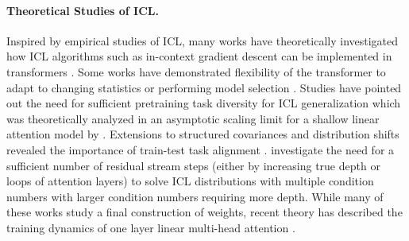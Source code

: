 \documentclass{article} %
\begin{document}
\paragraph{Theoretical Studies of ICL.} Inspired by empirical studies of ICL, many works have theoretically investigated how ICL algorithms such as in-context gradient descent can be implemented in transformers \citep{zhang2023trainedtransformerslearnlinear, ahn2023transformerslearnimplementpreconditioned, von2023transformers, li2023transformersalgorithmsgeneralizationstability, kim2024transformersminimaxoptimalnonparametric, akyurek2022learning, pathak2023transformersoptimallylearnregression, mahankali2023stepgradientdescentprovably}. Some works have demonstrated flexibility of the transformer to adapt to changing statistics \citep{vladymyrov2024lineartransformersversatileincontext} or performing model selection \citep{bai2023transformers}. Studies have pointed out the need for sufficient pretraining task diversity for ICL generalization \citep{raventós2023pretrainingtaskdiversityemergence, wu2024pretrainingtasksneededincontext} which was theoretically analyzed in an asymptotic scaling limit for a shallow linear attention model by  \cite{lu2025asymptotictheoryincontextlearning}. Extensions to structured covariances and distribution shifts revealed the importance of train-test task alignment \citet{letey2025pretraintesttaskalignmentgoverns}.  \citet{gatmiry2024roledepthloopingincontext} investigate the need for a sufficient number of residual stream steps (either by increasing true depth or loops of attention layers) to solve ICL distributions with multiple condition numbers with larger condition numbers requiring more depth. While many of these works study a final construction of weights, recent theory has described the training dynamics of one layer linear multi-head attention \citep{zhang2025trainingdynamicsincontextlearning}. 





\end{document}
